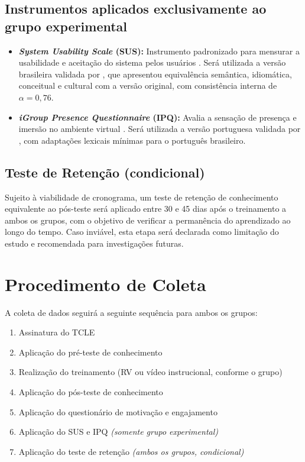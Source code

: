 \subsection{Instrumentos aplicados exclusivamente ao grupo experimental}

\begin{itemize}
    \item \textbf{\textit{System Usability Scale} (SUS):} Instrumento padronizado para mensurar a usabilidade e aceitação do sistema pelos usuários \cite{brooke1996}. Será utilizada a versão brasileira validada por , que apresentou equivalência semântica, idiomática, conceitual e cultural com a versão original, com consistência interna de $\alpha = 0{,}76$.
    \item \textbf{\textit{iGroup Presence Questionnaire} (IPQ):} Avalia a sensação de presença e imersão no ambiente virtual \cite{schubert2001}. Será utilizada a versão portuguesa validada por , com adaptações lexicais mínimas para o português brasileiro.
\end{itemize}

\subsection{Teste de Retenção (condicional)}

Sujeito à viabilidade de cronograma, um teste de retenção de conhecimento equivalente ao pós-teste será aplicado entre 30 e 45 dias após o treinamento a ambos os grupos, com o objetivo de verificar a permanência do aprendizado ao longo do tempo. Caso inviável, esta etapa será declarada como limitação do estudo e recomendada para investigações futuras.

\section{Procedimento de Coleta}

A coleta de dados seguirá a seguinte sequência para ambos os grupos:

\begin{enumerate}
    \item Assinatura do \gls{TCLE}
    \item Aplicação do pré-teste de conhecimento
    \item Realização do treinamento (RV ou vídeo instrucional, conforme o grupo)
    \item Aplicação do pós-teste de conhecimento
    \item Aplicação do questionário de motivação e engajamento
    \item Aplicação do SUS e IPQ \textit{(somente grupo experimental)}
    \item Aplicação do teste de retenção \textit{(ambos os grupos, condicional)}
\end{enumerate}

